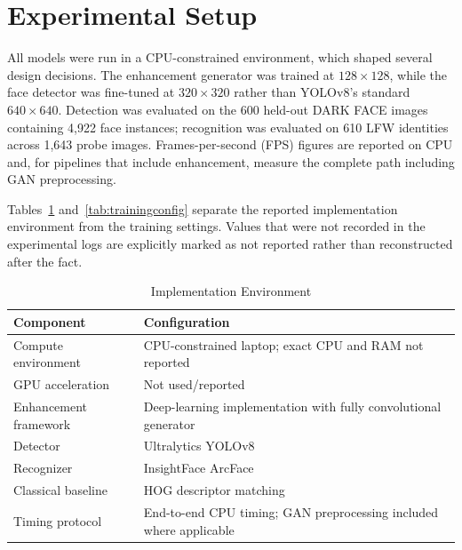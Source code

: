 \documentclass[conference]{IEEEtran}
\begin{document}
\section{Experimental Setup}
All models were run in a CPU-constrained environment, which
shaped several design decisions. The enhancement generator was
trained at $128\times128$, while the face detector was fine-tuned
at $320\times320$ rather than YOLOv8's standard $640\times640$.
Detection was evaluated on the 600 held-out DARK FACE images
containing 4{,}922 face instances; recognition was evaluated on 610
LFW identities across 1{,}643 probe images. Frames-per-second (FPS)
figures are reported on CPU and, for pipelines that include
enhancement, measure the complete path including GAN preprocessing.

Tables~\ref{tab:implementation} and~\ref{tab:trainingconfig}
separate the reported implementation environment from the training
settings. Values that were not recorded in the experimental logs are
explicitly marked as not reported rather than reconstructed after the
fact.

\begin{table}[!t]
\caption{Implementation Environment}
\label{tab:implementation}
\centering
\begin{tabular}{p{}p{}}
\toprule
\textbf{Component} & \textbf{Configuration} \\
\midrule
Compute environment & CPU-constrained laptop; exact CPU and RAM not reported \\
GPU acceleration & Not used/reported \\
Enhancement framework & Deep-learning implementation with fully convolutional generator \\
Detector & Ultralytics YOLOv8 \\
Recognizer & InsightFace ArcFace \\
Classical baseline & HOG descriptor matching \\
Timing protocol & End-to-end CPU timing; GAN preprocessing included where applicable \\
\bottomrule
\end{tabular}
\end{table}
\end{document}
